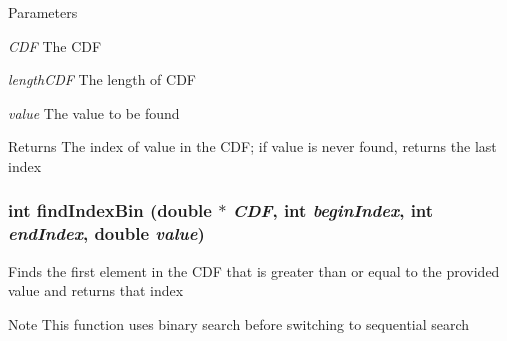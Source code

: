 \begin{DoxyParams}{Parameters}
\item[{\em CDF}]The CDF \item[{\em lengthCDF}]The length of CDF \item[{\em value}]The value to be found \end{DoxyParams}
\begin{DoxyReturn}{Returns}
The index of value in the CDF; if value is never found, returns the last index 
\end{DoxyReturn}
\hypertarget{ex__particle__CUDA__naive__full_8cu_a0952c4d9efa944180ca6deb470239fba}{
\subsubsection[{findIndexBin}]{\setlength{\rightskip}{0pt plus 5cm}int findIndexBin (double $\ast$ {\em CDF}, \/  int {\em beginIndex}, \/  int {\em endIndex}, \/  double {\em value})}}
\label{ex__particle__CUDA__naive__full_8cu_a0952c4d9efa944180ca6deb470239fba}
Finds the first element in the CDF that is greater than or equal to the provided value and returns that index \begin{DoxyNote}{Note}
This function uses binary search before switching to sequential search 
\end{DoxyNote}

